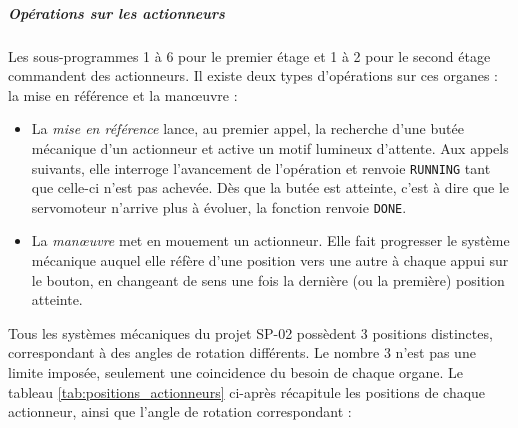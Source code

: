 \subparagraph*{Opérations sur les actionneurs} Les sous-programmes 1 à 6 pour le premier étage et 1 à 2 pour le second étage
commandent des actionneurs. Il existe deux types d'opérations sur ces organes : la mise en référence et la man\oe uvre :
\begin{itemize}
	\item La \emph{mise en référence} lance, au premier appel, la recherche d'une butée mécanique d'un actionneur et active un
	motif lumineux d'attente. Aux appels suivants, elle interroge l'avancement de l'opération et renvoie \texttt{RUNNING} tant
	que celle-ci n'est pas achevée. Dès que la butée est atteinte, c'est à dire que le servomoteur n'arrive plus à évoluer, la
	fonction renvoie \texttt{DONE}.
	\item La \emph{man\oe uvre} met en mouement un actionneur. Elle fait progresser le système mécanique auquel elle réfère d'une
	position vers une autre à chaque appui sur le bouton, en changeant de sens une fois la dernière (ou la première) position
	atteinte.
\end{itemize}

Tous les systèmes mécaniques du projet SP-02 possèdent 3 positions distinctes, correspondant à des angles de rotation différents.
Le nombre 3 n'est pas une limite imposée, seulement une coincidence du besoin de chaque organe. Le tableau
\ref{tab:positions_actionneurs} ci-après récapitule les positions de chaque actionneur, ainsi que l'angle de rotation
correspondant :

\vspace{-0.1cm}

